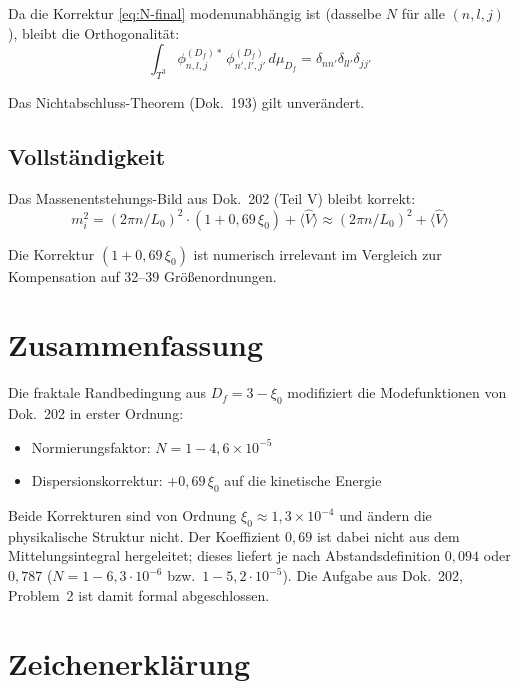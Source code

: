 Da die Korrektur \eqref{eq:N-final} modenunabhängig ist
(dasselbe $N$ für alle $(n,l,j)$), bleibt die Orthogonalität:
\begin{equation}
  \int_{T^3}
  \phi_{n,l,j}^{(D_f)*}\,\phi_{n',l',j'}^{(D_f)}\,d\mu_{D_f}
  = \delta_{nn'}\delta_{ll'}\delta_{jj'}
\end{equation}

Das Nichtabschluss-Theorem (Dok.~193) gilt unverändert.

\subsection{Vollständigkeit}

Das Massenentstehungs-Bild aus Dok.~202 (Teil V) bleibt korrekt:
\[
  m_i^2 = (2\pi n/L_0)^2\cdot(1+0{,}69\,\xi_0) + \langle\hat{V}\rangle
  \approx (2\pi n/L_0)^2 + \langle\hat{V}\rangle
\]

Die Korrektur $(1+0{,}69\,\xi_0)$ ist numerisch irrelevant im Vergleich
zur Kompensation auf 32--39 Größenordnungen.

\section*{Zusammenfassung}

Die fraktale Randbedingung aus $D_f = 3-\xi_0$ modifiziert die
Modefunktionen von Dok.~202 in erster Ordnung:
\begin{itemize}
  \item Normierungsfaktor: $N = 1 - 4{,}6\times10^{-5}$
  \item Dispersionskorrektur: $+0{,}69\,\xi_0$ auf die kinetische Energie
\end{itemize}
Beide Korrekturen sind von Ordnung $\xi_0 \approx 1{,}3\times10^{-4}$
und ändern die physikalische Struktur nicht. Der Koeffizient $0{,}69$
ist dabei nicht aus dem Mittelungsintegral hergeleitet; dieses liefert
je nach Abstandsdefinition $0{,}094$ oder $0{,}787$
($N = 1 - 6{,}3 \cdot 10^{-6}$ bzw.\ $1 - 5{,}2 \cdot 10^{-5}$).
Die Aufgabe aus Dok.~202, Problem~2 ist damit formal abgeschlossen.


\section*{Zeichenerklärung}

